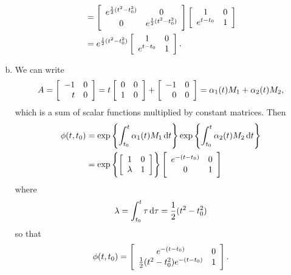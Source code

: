 \documentclass{article}
\begin{document}
\begin{enumerate}[(a)]
{\begin{align*}
    &=
    \left[\begin{array}{c c}
      e^{\frac{1}{2}(t^2 - t_0^2)} & 0 \\
      0                      & e^{\frac{1}{2}(t^2 - t_0^2)}
    \end{array}\right]
    \left[\begin{array}{c c}
      1         & 0 \\
      e^{t - t_0} & 1
    \end{array}\right] \\
    &=
    e^{\frac{1}{2}(t^2 - t_0^2)}
    \left[\begin{array}{c c}
      1         & 0 \\
      e^{t - t_0} & 1
    \end{array}\right].
    \end{align*}
  }
  \item{
    We can write
    $$
    A =
    \left[\begin{array}{r r}
     -1 & 0 \\
      t & 0
    \end{array}\right]
    =
    t
    \left[\begin{array}{c c}
      0 & 0 \\
      1 & 0
    \end{array}\right]
    +
    \left[\begin{array}{r r}
     -1 & 0 \\
      0 & 0
    \end{array}\right]
    =
    \alpha_1(t) M_1 + \alpha_2(t) M_2,
    $$
    which is a sum of scalar functions multiplied by constant
    matrices. Then
    \begin{align*}
    \phi(t, t_0)
    &=
    \exp \left\{
      \int_{t_0}^{t} \alpha_1(t) M_1 \dif t
    \right\}
    \exp \left\{
      \int_{t_0}^{t} \alpha_2(t) M_2 \dif t
    \right\} \\
    &=
   \exp\left\{
     \left[\begin{array}{c c}
       1       & 0 \\
       \lambda & 1
     \end{array}\right]
   \right\}
   \left[\begin{array}{c c}
     e^{-(t - t_0)} & 0 \\
     0           & 1
   \end{array}\right]
   \end{align*}
   where
   $$
   \lambda = \int_{t_0}^t \tau \dif \tau = \frac{1}{2}(t^2 - t_0^2)
   $$
   so that
   $$
   \phi(t, t_0) =
   \left[\begin{array}{c c}
     e^{-(t - t_0)}                         & 0 \\
     \frac{1}{2}(t^2 - t_0^2) e^{-(t - t_0)} & 1
   \end{array}\right].
   $$
  }
\end{enumerate}
\end{document}
